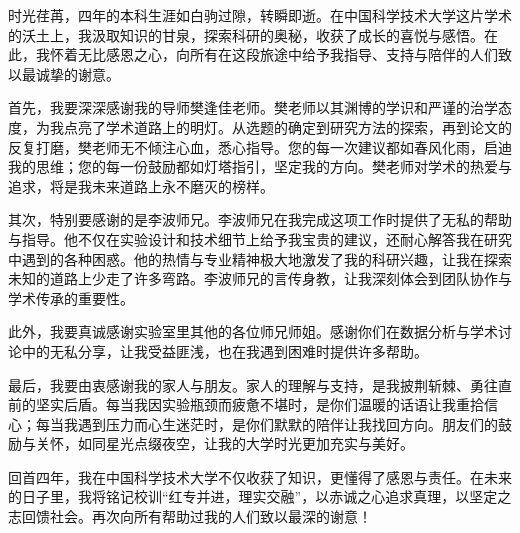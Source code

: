 
\begin{acknowledgements}
时光荏苒，四年的本科生涯如白驹过隙，转瞬即逝。在中国科学技术大学这片学术的沃土上，我汲取知识的甘泉，探索科研的奥秘，收获了成长的喜悦与感悟。在此，我怀着无比感恩之心，向所有在这段旅途中给予我指导、支持与陪伴的人们致以最诚挚的谢意。

首先，我要深深感谢我的导师樊逢佳老师。樊老师以其渊博的学识和严谨的治学态度，为我点亮了学术道路上的明灯。从选题的确定到研究方法的探索，再到论文的反复打磨，樊老师无不倾注心血，悉心指导。您的每一次建议都如春风化雨，启迪我的思维；您的每一份鼓励都如灯塔指引，坚定我的方向。樊老师对学术的热爱与追求，将是我未来道路上永不磨灭的榜样。

其次，特别要感谢的是李波师兄。李波师兄在我完成这项工作时提供了无私的帮助与指导。他不仅在实验设计和技术细节上给予我宝贵的建议，还耐心解答我在研究中遇到的各种困惑。他的热情与专业精神极大地激发了我的科研兴趣，让我在探索未知的道路上少走了许多弯路。李波师兄的言传身教，让我深刻体会到团队协作与学术传承的重要性。

此外，我要真诚感谢实验室里其他的各位师兄师姐。感谢你们在数据分析与学术讨论中的无私分享，让我受益匪浅，也在我遇到困难时提供许多帮助。

最后，我要由衷感谢我的家人与朋友。家人的理解与支持，是我披荆斩棘、勇往直前的坚实后盾。每当我因实验瓶颈而疲惫不堪时，是你们温暖的话语让我重拾信心；每当我遇到压力而心生迷茫时，是你们默默的陪伴让我找回方向。朋友们的鼓励与关怀，如同星光点缀夜空，让我的大学时光更加充实与美好。

回首四年，我在中国科学技术大学不仅收获了知识，更懂得了感恩与责任。在未来的日子里，我将铭记校训“红专并进，理实交融”，以赤诚之心追求真理，以坚定之志回馈社会。再次向所有帮助过我的人们致以最深的谢意！
\end{acknowledgements}

